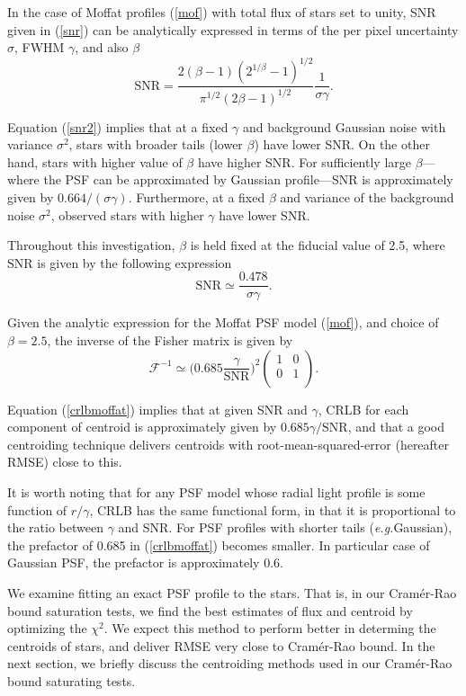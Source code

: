 \documentclass[12pt, preprint]{aastex}
\newcommand{\latin}[1]{\textit{#1}}
\newcommand{\beq}{\begin{equation}}
\newcommand{\eeq}{\end{equation}}
\newcommand{\eg}{\latin{e.g.}}
\begin{document}
 In the case of Moffat profiles (\ref{mof}) with total flux of stars set to unity, 
SNR given in (\ref{snr}) can be analytically 
expressed in terms of the per pixel uncertainty
$\sigma$, FWHM $\gamma$, and also $\beta$
\beq
\text{SNR} = \frac{2(\beta-1)(2^{1/\beta}-1)^{1/2}}{\pi^{1/2}(2\beta-1)^{1/2}}\frac{1}{\sigma \gamma}.
\label{snr2}
\eeq

Equation (\ref{snr2}) implies that at a fixed $\gamma$ and background Gaussian noise 
with variance $\sigma^{2}$, stars with broader tails (lower $\beta$) have lower SNR.
On the other hand, stars with higher value of $\beta$ have higher SNR. 
For sufficiently large $\beta$---where the PSF can be
approximated by Gaussian profile---SNR is approximately given by $0.664/(\sigma\gamma)$.
Furthermore, at a fixed $\beta$ and variance of the background noise $\sigma^{2}$,
observed stars with higher $\gamma$ have lower SNR.  

Throughout this investigation, $\beta$ is held fixed at the fiducial value of 2.5, where SNR
is given by the following expression
\beq
\text{SNR} \simeq \frac{0.478}{\sigma \gamma}.
\eeq

Given the analytic expression for the Moffat PSF model (\ref{mof}), and choice of $\beta=2.5$, 
the inverse of the Fisher matrix is given by
\beq
  \mathcal{F}^{-1} \simeq \Big(0.685 \frac{\gamma}{\text{SNR}}\Big)^{2} 
  \begin{pmatrix}
      1 & 0\\
      0 & 1\\
  \end{pmatrix}.
\label{crlbmoffat}
\eeq

Equation (\ref{crlbmoffat}) implies that at given SNR and $\gamma$,
CRLB for each component of centroid is approximately given by $0.685\gamma/\text{SNR}$,
and that a good centroiding technique delivers centroids with
root-mean-squared-error (hereafter RMSE) close to this. 

It is worth noting that for any PSF model whose radial light profile is some function of 
$r/\gamma$, CRLB has the same functional form, in that it is proportional to the ratio
between $\gamma$ and SNR. 
For PSF profiles with shorter tails (\eg Gaussian), the prefactor of 0.685 in (\ref{crlbmoffat})
becomes smaller. In particular case of Gaussian PSF, the prefactor is approximately 0.6. 

We examine fitting an exact
 PSF profile to the stars. That is, in our Cram\'{e}r-Rao bound saturation tests, we find the best
 estimates of flux and centroid by optimizing the $\chi^{2}$.
 We expect this method to perform better in determing the centroids
 of stars, and deliver RMSE very close to Cram\'{e}r-Rao bound. In the next section,
 we briefly discuss the centroiding methods used in our Cram\'{e}r-Rao bound saturating tests.
 
\end{document}
